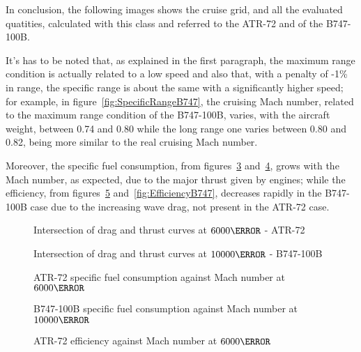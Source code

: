 \bigskip
\noindent
In conclusion, the following images shows the cruise grid, and all the evaluated quatities, calculated with this class and referred to the ATR-72 and of the B747-100B. 

It's has to be noted that, as explained in the first paragraph, the maximum range condition is actually related to a low speed and also that, with a penalty of -1\% in range, the specific range is about the same with a significantly higher speed; for example, in figure~\ref{fig:SpecificRangeB747}, the cruising Mach number, related to the maximum range condition of the B747-100B, varies, with the aircraft weight, between 0.74 and 0.80 while the long range one varies between 0.80 and 0.82, being more similar to the real cruising Mach number.

Moreover, the specific fuel consumption, from figures~\ref{fig:sfcATR} and~\ref{fig:sfcB747}, grows with the Mach number, as expected, due to the major thrust given by engines; while the efficiency, from figures~\ref{fig:EfficiencyATR} and~\ref{fig:EfficiencyB747}, decreases rapidly in the B747-100B case due to the increasing wave drag, not present in the ATR-72 case.

\begin{figure}[t]
\centering

\caption{Intersection of drag and thrust curves at $\si{6000}{\meter}$ - ATR-72}
\label{fig:ThrustDragATR}
\end{figure}

\begin{figure}[b]
\centering

\caption{Intersection of drag and thrust curves at $\si{10000}{\meter}$ - B747-100B}
\label{fig:ThrustDragB747}
\end{figure}

\begin{figure}[t]
\centering

\caption{ATR-72 specific fuel consumption against Mach number at $\si{6000}{\meter}$}
\label{fig:sfcATR}
\end{figure}

\begin{figure}[b]
\centering

\caption{B747-100B specific fuel consumption against Mach number at $\si{10000}{\meter}$}
\label{fig:sfcB747}
\end{figure}

\begin{figure}[t]
\centering

\caption{ATR-72 efficiency against Mach number at $\si{6000}{\meter}$}
\label{fig:EfficiencyATR}
\end{figure}

